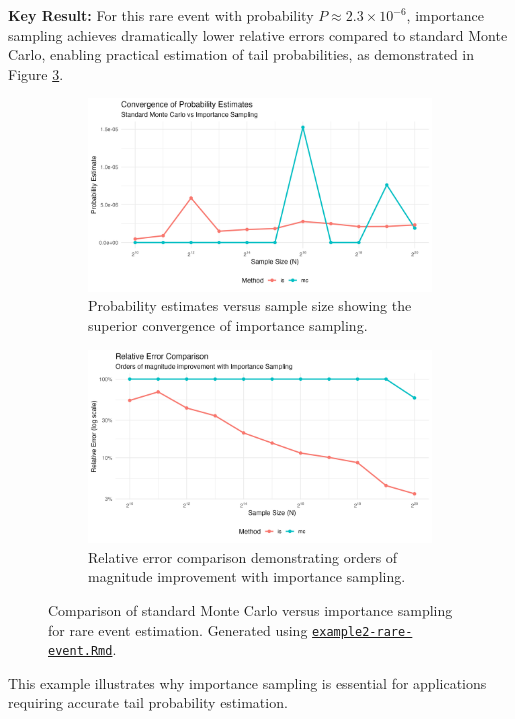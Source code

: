 \textbf{Key Result:} For this rare event with probability $P \approx 2.3 \times 10^{-6}$, importance sampling achieves dramatically lower relative errors compared to standard Monte Carlo, enabling practical estimation of tail probabilities, as demonstrated in Figure \ref{fig:rare-events-analysis}.

\begin{figure}[h]
    \centering
    \begin{subfigure}[b]{0.48\textwidth}
        \centering
        \includegraphics[width=\textwidth]{figures/ex2-estimates.png}
        \caption{Probability estimates versus sample size showing the superior convergence of importance sampling.}
        \label{fig:rare-events-estimates}
    \end{subfigure}
    \hfill
    \begin{subfigure}[b]{0.48\textwidth}
        \centering
        \includegraphics[width=\textwidth]{figures/ex2-rel-errors.png}
        \caption{Relative error comparison demonstrating orders of magnitude improvement with importance sampling.}
        \label{fig:rare-events-relative-errors}
    \end{subfigure}
    \caption{Comparison of standard Monte Carlo versus importance sampling for rare event estimation. Generated using \href{https://github.com/NikoGerman/Seminar/blob/main/Notebooks/example2-rare-event.Rmd}{\texttt{example2-rare-event.Rmd}}.}
    \label{fig:rare-events-analysis}
\end{figure}

This example illustrates why importance sampling is essential for applications requiring accurate tail probability estimation.